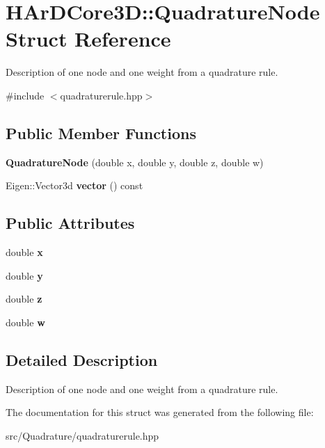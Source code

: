 \hypertarget{structHArDCore3D_1_1QuadratureNode}{}\section{H\+Ar\+D\+Core3D\+:\+:Quadrature\+Node Struct Reference}
\label{structHArDCore3D_1_1QuadratureNode}


Description of one node and one weight from a quadrature rule.  




{\ttfamily \#include $<$quadraturerule.\+hpp$>$}

\subsection*{Public Member Functions}
\begin{DoxyCompactItemize}
\item 
{\bfseries Quadrature\+Node} (double x, double y, double z, double w)
\item 
Eigen\+::\+Vector3d {\bfseries vector} () const
\end{DoxyCompactItemize}
\subsection*{Public Attributes}
\begin{DoxyCompactItemize}
\item 
double {\bfseries x}
\item 
double {\bfseries y}
\item 
double {\bfseries z}
\item 
double {\bfseries w}
\end{DoxyCompactItemize}


\subsection{Detailed Description}
Description of one node and one weight from a quadrature rule. 

The documentation for this struct was generated from the following file\+:\begin{DoxyCompactItemize}
\item 
src/\+Quadrature/quadraturerule.\+hpp\end{DoxyCompactItemize}
